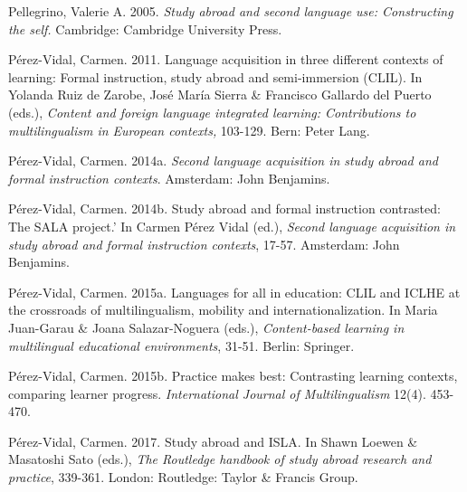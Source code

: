 \begin{styleStandard}
Pellegrino, Valerie A. 2005. \textit{Study abroad and second language use: Constructing the self. }Cambridge: Cambridge University Press.
\end{styleStandard}


\begin{styleStandard}
Pérez-Vidal, Carmen. 2011. Language acquisition in three different contexts of learning: Formal instruction, study abroad and semi-immersion (CLIL). In Yolanda Ruiz de Zarobe, José María Sierra \& Francisco Gallardo del Puerto (eds.), \textit{Content and foreign language integrated learning: Contributions to multilingualism in European contexts, }103-129. Bern: Peter Lang.
\end{styleStandard}


\begin{styleStandard}
Pérez-Vidal, Carmen. 2014a. \textit{Second language acquisition in study abroad and formal instruction contexts}. Amsterdam: John Benjamins.
\end{styleStandard}


\begin{styleStandard}
Pérez-Vidal, Carmen. 2014b. Study abroad and formal instruction contrasted: The SALA project.’ In Carmen Pérez Vidal (ed.), \textit{Second language acquisition in study abroad and formal instruction contexts}, 17-57. Amsterdam: John Benjamins.
\end{styleStandard}


\begin{styleStandard}
Pérez-Vidal, Carmen. 2015a. Languages for all in education: CLIL and ICLHE at the crossroads of multilingualism, mobility and internationalization. In Maria Juan-Garau \& Joana Salazar-Noguera (eds.), \textit{Content-based learning in multilingual educational environments}, 31-51. Berlin: Springer.
\end{styleStandard}


\begin{styleStandard}
Pérez-Vidal, Carmen. 2015b. Practice makes best: Contrasting learning contexts, comparing learner progress. \textit{International Journal of Multilingualism }12(4). 453-470.
\end{styleStandard}


\begin{styleStandard}
Pérez-Vidal, Carmen. 2017. Study abroad and ISLA. In Shawn Loewen \& Masatoshi Sato (eds.),\textit{ The Routledge handbook of study abroad research and practice}, 339-361. London: Routledge: Taylor \& Francis Group.
\end{styleStandard}


